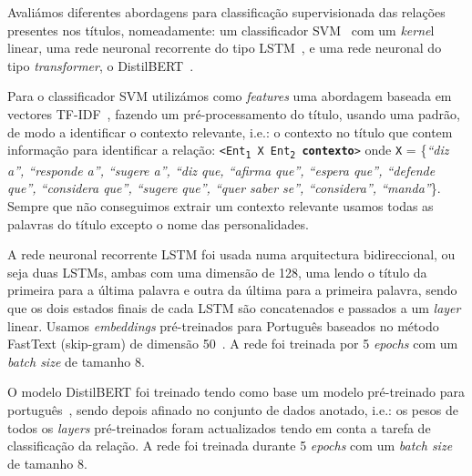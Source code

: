 \documentclass[a4paper, twocolumn, 11pt, twoside]{article}
\begin{document}
Avaliámos diferentes abordagens para classificação supervisionada das relações presentes nos títulos, nomeadamente: um classificador SVM~\citep{cortes1995support} com um \textit{kerne}l linear, uma rede neuronal recorrente do tipo LSTM~\citep{10.1162/neco.1997.9.8.1735}, e uma rede neuronal do tipo \textit{transformer}, o DistilBERT~\citep{9463516}.

Para o classificador SVM utilizámos como \textit{features} uma abordagem baseada em vectores TF-IDF~\citep{DBLP:journals/ipm/SaltonB88}, fazendo um pré-processamento do título, usando uma padrão, de modo a identificar o contexto relevante, i.e.: o contexto no título que contem informação para identificar a relação: \texttt{<Ent\textsubscript{1} X Ent\textsubscript{2} \textbf{contexto}>} onde \texttt{X} = \{\textit{“diz a”, “responde a”, “sugere a”, “diz que, “afirma que”, “espera que”, “defende que”, “considera que”, “sugere que”, “quer saber se”, “considera”, “manda”}\}. Sempre que não conseguimos extrair um contexto relevante usamos todas as palavras do título excepto o nome das personalidades.

A rede neuronal recorrente LSTM foi usada numa arquitectura bidireccional, ou seja duas LSTMs, ambas com uma dimensão de 128, uma lendo o título da primeira para a última palavra e outra da última para a primeira palavra, sendo que os dois estados finais de cada LSTM são concatenados e passados a um \textit{layer} linear. Usamos \textit{embeddings} pré-treinados para Português baseados no método FastText (skip-gram) de dimensão 50~\citep{hartmann-etal-2017-portuguese}. A rede foi treinada por 5 \textit{epochs} com um \textit{batch size} de tamanho 8.

O modelo DistilBERT foi treinado tendo como base um modelo pré-treinado para português~\citep{abdaoui-etal-2020-load}, sendo depois afinado no conjunto de dados anotado, i.e.: os pesos de todos os \textit{layers} pré-treinados foram actualizados tendo em conta a tarefa de classificação da relação. A rede foi treinada durante 5 \textit{epochs} com um \textit{batch size} de tamanho 8.
\end{document}
